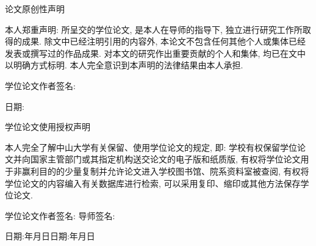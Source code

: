 ﻿%
%
%
\thispagestyle{empty}

\begin{center}
   {\hei\xiaoerhao 论文原创性声明}
\end{center}
\vspace{1cm}

{\sihao 本人郑重声明: 所呈交的学位论文, 是本人在导师的指导下,
独立进行研究工作所取得的成果. 除文中已经注明引用的内容外,
本论文不包含任何其他个人或集体已经发表或撰写过的作品成果.
对本文的研究作出重要贡献的个人和集体, 均已在文中以明确方式标明.
本人完全意识到本声明的法律结果由本人承担.

\vspace{1.5cm}

\hspace*{\fill}学位论文作者签名:\underline{\hspace{4cm}}

\hspace*{\fill}日期:\underline{\hspace{4cm}}

}
\vspace{2.5cm}

\begin{center}
   {\hei\xiaoerhao 学位论文使用授权声明}
\end{center}
\vspace{1cm} {\sihao
\hspace{2em}本人完全了解中山大学有关保留、使用学位论文的规定, 即:
学校有权保留学位论文并向国家主管部门或其指定机构送交论文的电子版和纸质版,
有权将学位论文用于非赢利目的的少量复制并允许论文进入学校图书馆、院系资料室被查阅,
有权将学位论文的内容编入有关数据库进行检索,
可以采用复印、缩印或其他方法保存学位论文.

\vspace{1.5cm}

\hspace{2cm}学位论文作者签名: \hspace{3cm}导师签名:

\hspace{2cm}日期:\hspace{10mm}年\hspace{8mm}月\hspace{8mm}日\hspace{2.1cm}日期:\hspace{10mm}年\hspace{8mm}月\hspace{8mm}日

}
